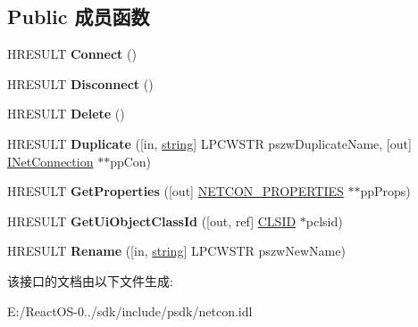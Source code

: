 \subsection*{Public 成员函数}
\begin{DoxyCompactItemize}
\item 
\mbox{\label{interface_i_net_connection_a198c0c94d8c8a1852a55790daf5f8065}} 
H\+R\+E\+S\+U\+LT {\bfseries Connect} ()
\item 
\mbox{\label{interface_i_net_connection_a8aaeb0f53f878dc1246ecc45699cd0f9}} 
H\+R\+E\+S\+U\+LT {\bfseries Disconnect} ()
\item 
\mbox{\label{interface_i_net_connection_a641ae87388db32acc1af0fd77e77c65a}} 
H\+R\+E\+S\+U\+LT {\bfseries Delete} ()
\item 
\mbox{\label{interface_i_net_connection_ab027d2b91fbedb902ccf050edf99ca88}} 
H\+R\+E\+S\+U\+LT {\bfseries Duplicate} (\mbox{[}in, \hyperlink{structstring}{string}\mbox{]} L\+P\+C\+W\+S\+TR pszw\+Duplicate\+Name, \mbox{[}out\mbox{]} \hyperlink{interface_i_net_connection}{I\+Net\+Connection} $\ast$$\ast$pp\+Con)
\item 
\mbox{\label{interface_i_net_connection_a9e41a1aea7e3defb3069be31b651a325}} 
H\+R\+E\+S\+U\+LT {\bfseries Get\+Properties} (\mbox{[}out\mbox{]} \hyperlink{struct_i_net_connection_1_1tag_n_e_t_c_o_n___p_r_o_p_e_r_t_i_e_s}{N\+E\+T\+C\+O\+N\+\_\+\+P\+R\+O\+P\+E\+R\+T\+I\+ES} $\ast$$\ast$pp\+Props)
\item 
\mbox{\label{interface_i_net_connection_af324d8c2a91d14d118f6f242edbcac4d}} 
H\+R\+E\+S\+U\+LT {\bfseries Get\+Ui\+Object\+Class\+Id} (\mbox{[}out, ref\mbox{]} \hyperlink{struct___i_i_d}{C\+L\+S\+ID} $\ast$pclsid)
\item 
\mbox{\label{interface_i_net_connection_aab5458c13f8e2da6b6e44d62b4b90a64}} 
H\+R\+E\+S\+U\+LT {\bfseries Rename} (\mbox{[}in, \hyperlink{structstring}{string}\mbox{]} L\+P\+C\+W\+S\+TR pszw\+New\+Name)
\end{DoxyCompactItemize}


该接口的文档由以下文件生成\+:\begin{DoxyCompactItemize}
\item 
E\+:/\+React\+O\+S-\/0../sdk/include/psdk/netcon.\+idl\end{DoxyCompactItemize}
